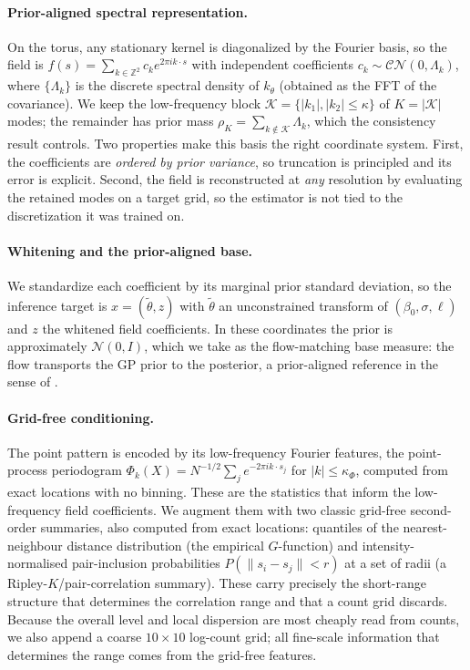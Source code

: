 \documentclass[10pt,twocolumn]{article}
\newcommand{\Z}{\mathbb{Z}}
\begin{document}
\paragraph{Prior-aligned spectral representation.}
On the torus, any stationary kernel is diagonalized by the Fourier basis, so the
field is $f(s)=\sum_{k\in\Z^2} c_k e^{2\pi i k\cdot s}$ with independent
coefficients $c_k\sim\mathcal{CN}(0,\Lambda_k)$, where $\{\Lambda_k\}$ is the
discrete spectral density of $k_\theta$ (obtained as the FFT of the covariance).
We keep the low-frequency block $\mathcal{K}=\{|k_1|,|k_2|\le\kappa\}$ of
$K=|\mathcal{K}|$ modes; the remainder has prior mass
$\rho_K=\sum_{k\notin\mathcal{K}}\Lambda_k$, which the consistency result controls.
Two properties make this basis the right coordinate system. First, the
coefficients are \emph{ordered by prior variance}, so truncation is principled and
its error is explicit. Second, the field is reconstructed at \emph{any} resolution
by evaluating the retained modes on a target grid, so the estimator is not tied to
the discretization it was trained on.

\paragraph{Whitening and the prior-aligned base.}
We standardize each coefficient by its marginal prior standard deviation, so the
inference target is $x=(\tilde\theta, z)$ with $\tilde\theta$ an unconstrained
transform of $(\beta_0,\sigma,\ell)$ and $z$ the whitened field coefficients. In
these coordinates the prior is approximately $\mathcal{N}(0,I)$, which we take as
the flow-matching base measure: the flow transports the GP prior to the posterior,
a prior-aligned reference in the sense of \citet{cheng2026function}.

\paragraph{Grid-free conditioning.}
The point pattern is encoded by its low-frequency Fourier features, the
point-process periodogram
$\Phi_k(X)=N^{-1/2}\sum_{j}e^{-2\pi i k\cdot s_j}$ for $|k|\le\kappa_\Phi$,
computed from exact locations with no binning. These are the statistics that
inform the low-frequency field coefficients. We augment them with two classic
grid-free second-order summaries, also computed from exact locations: quantiles of
the nearest-neighbour distance distribution (the empirical $G$-function) and
intensity-normalised pair-inclusion probabilities $P(\lVert s_i-s_j\rVert<r)$ at a
set of radii (a Ripley-$K$/pair-correlation summary). These carry precisely the
short-range structure that determines the correlation range and that a count grid
discards. Because the overall level and local dispersion are most cheaply read
from counts, we also append a coarse $10\times10$ log-count grid; all fine-scale
information that determines the range comes from the grid-free features.
\end{document}
